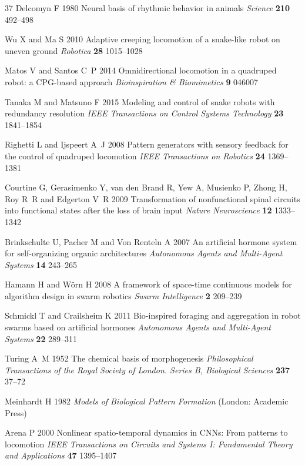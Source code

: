 \documentclass{iopjournal}
\begin{document}
\begin{thebibliography}{37}
Delcomyn F 1980 Neural basis of rhythmic behavior in animals {\em Science\/} {\bf 210} 492--498

Wu X and Ma S 2010 Adaptive creeping locomotion of a snake-like robot on uneven ground {\em Robotica\/} {\bf 28} 1015--1028

Matos V and Santos C~P 2014 Omnidirectional locomotion in a quadruped robot: a CPG-based approach {\em Bioinspiration \& Biomimetics\/} {\bf 9} 046007

Tanaka M and Matsuno F 2015 Modeling and control of snake robots with redundancy resolution {\em IEEE Transactions on Control Systems Technology\/} {\bf 23} 1841--1854

Righetti L and Ijspeert A~J 2008 Pattern generators with sensory feedback for the control of quadruped locomotion {\em IEEE Transactions on Robotics\/} {\bf 24} 1369--1381

Courtine G, Gerasimenko Y, van den Brand R, Yew A, Musienko P, Zhong H, Roy R~R and Edgerton V~R 2009 Transformation of nonfunctional spinal circuits into functional states after the loss of brain input {\em Nature Neuroscience\/} {\bf 12} 1333--1342

Brinkschulte U, Pacher M and Von Renteln A 2007 An artificial hormone system for self-organizing organic architectures {\em Autonomous Agents and Multi-Agent Systems\/} {\bf 14} 243--265

Hamann H and W{\"o}rn H 2008 A framework of space-time continuous models for algorithm design in swarm robotics {\em Swarm Intelligence\/} {\bf 2} 209--239

Schmickl T and Crailsheim K 2011 Bio-inspired foraging and aggregation in robot swarms based on artificial hormones {\em Autonomous Agents and Multi-Agent Systems\/} {\bf 22} 289--311

Turing A~M 1952 The chemical basis of morphogenesis {\em Philosophical Transactions of the Royal Society of London. Series B, Biological Sciences\/} {\bf 237} 37--72

Meinhardt H 1982 {\em Models of Biological Pattern Formation\/} (London: Academic Press)

Arena P 2000 Nonlinear spatio-temporal dynamics in CNNs: From patterns to locomotion {\em IEEE Transactions on Circuits and Systems I: Fundamental Theory and Applications\/} {\bf 47} 1395--1407


\end{thebibliography}
\end{document}
